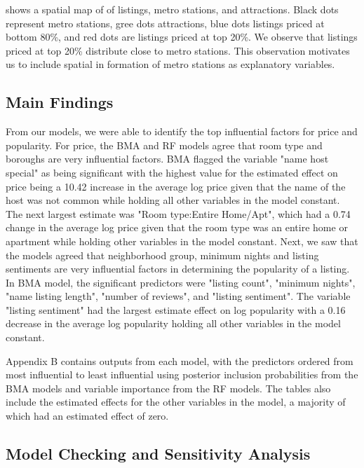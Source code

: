 \documentclass[10pt]{jmlr}%
\begin{document}
 shows a spatial map of  of listings, metro stations, and attractions. Black dots represent metro stations, gree dots attractions, blue dots listings priced at bottom 80\%, and red dots are listings priced at top 20\%. We observe that listings priced at top 20\% distribute close to metro stations. This observation motivates us to include spatial in formation of metro stations as explanatory variables.



\subsection{Main Findings}

From our models, we were able to identify the top influential factors for price and popularity. For price, the BMA and RF models agree that room type and boroughs are very influential factors. BMA flagged the variable "name host special" as being significant with the highest value for the estimated effect on price being a 10.42 increase in the average log price given that the name of the host was not common while holding all other variables in the model constant. The next largest estimate was "Room type:Entire Home/Apt", which had a 0.74 change in the average log price given that the room type was an entire home or apartment while holding other variables in the model constant. Next, we saw that the models agreed that neighborhood group, minimum nights and listing sentiments are very influential factors in determining the popularity of a listing. In BMA model, the significant predictors were "listing count", "minimum nights", "name listing length", "number of reviews", and "listing sentiment". The variable "listing sentiment" had the largest estimate effect on log popularity with a 0.16 decrease in the average log popularity holding all other variables in the model constant. 

Appendix B contains outputs from each model, with the predictors ordered from most influential to least influential using posterior inclusion probabilities from the BMA models and variable importance from the RF models. The tables also include the estimated effects for the other variables in the model, a majority of which had an estimated effect of zero. 

\subsection{Model Checking and Sensitivity Analysis}
\end{document}
